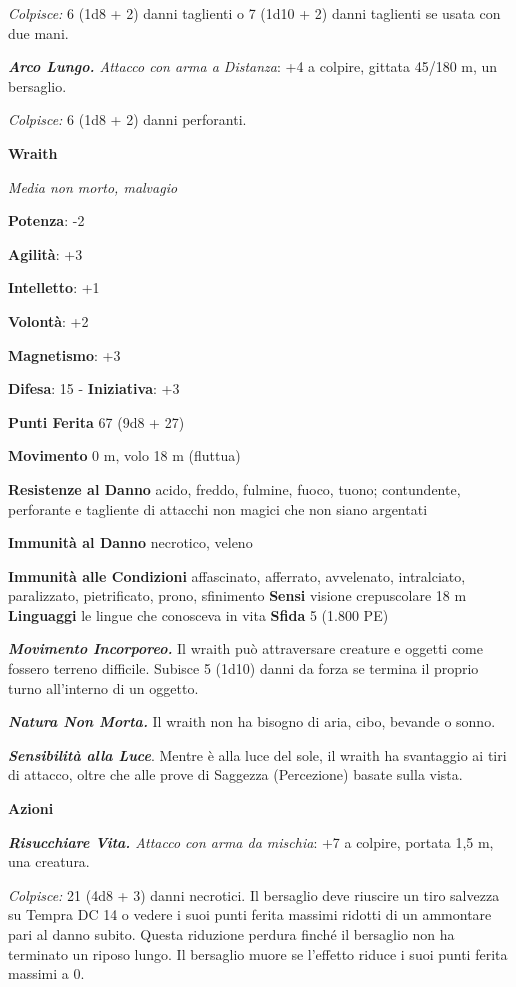 \begin{multicols}{2}
\emph{Colpisce:} 6 (1d8 + 2) danni taglienti o 7 (1d10 + 2) danni
taglienti se usata con due mani.

\emph{\textbf{Arco Lungo.} Attacco con arma a Distanza}: +4 a colpire,
gittata 45/180 m, un bersaglio.

\emph{Colpisce:} 6 (1d8 + 2) danni perforanti.

\textbf{Wraith}

\emph{Media non morto, malvagio}

\textbf{Potenza}: -2

\textbf{Agilità}: +3

\textbf{Intelletto}: +1

\textbf{Volontà}: +2

\textbf{Magnetismo}: +3

\textbf{Difesa}: 15 - \textbf{Iniziativa}: +3

\textbf{Punti Ferita} 67 (9d8 + 27)

\textbf{Movimento} 0 m, volo 18 m (fluttua)

\textbf{Resistenze al Danno} acido, freddo, fulmine, fuoco, tuono;
contundente, perforante e tagliente di attacchi non magici che non siano
argentati

\textbf{Immunità al Danno} necrotico, veleno

\textbf{Immunità alle Condizioni} affascinato, afferrato, avvelenato,
intralciato, paralizzato, pietrificato, prono, sfinimento \textbf{Sensi}
visione crepuscolare 18 m \textbf{Linguaggi} le lingue
che conosceva in vita \textbf{Sfida} 5 (1.800 PE)

\emph{\textbf{Movimento Incorporeo.}} Il wraith può attraversare
creature e oggetti come fossero terreno difficile. Subisce 5 (1d10)
danni da forza se termina il proprio turno all'interno di un oggetto.

\emph{\textbf{Natura Non Morta.}} Il wraith non ha bisogno di aria,
cibo, bevande o sonno.

\emph{\textbf{Sensibilità alla Luce}}. Mentre è alla luce del sole, il
wraith ha svantaggio ai tiri di attacco, oltre che alle prove di
Saggezza (Percezione) basate sulla vista.

\textbf{Azioni}

\emph{\textbf{Risucchiare Vita.} Attacco con arma da mischia}: +7 a
colpire, portata 1,5 m, una creatura.

\emph{Colpisce:} 21 (4d8 + 3) danni necrotici. Il bersaglio deve
riuscire un tiro salvezza su Tempra DC 14 o vedere i suoi punti
ferita massimi ridotti di un ammontare pari al danno subito. Questa
riduzione perdura finché il bersaglio non ha terminato un riposo lungo.
Il bersaglio muore se l'effetto riduce i suoi punti ferita massimi a 0.


\end{multicols}
